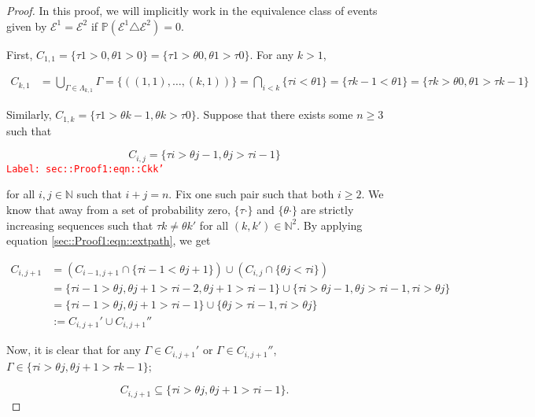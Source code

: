 \documentclass[12pt]{article}
\newcommand{\mb}{\mathbb}
\newcommand{\mc}{\mathcal}
\newcommand{\tr}{\textcolor{red}}
\newcommand{\labe}[1]{\tr{\texttt{Label: #1}}}
\newcommand{\ind}{\hspace{24pt}}
\newcommand{\pr}{\mb{P}}							%
\newcommand{\rt}{\tau}							%
\newcommand{\rtt}{\theta}						%
\renewcommand{\it}{k}							%
\newcommand{\apath}{\Gamma}						%
\newcommand{\pathset}[2]{\Lambda_{#1,#2}}		%
\newcommand{\pathsete}[2]{C_{#1,#2}}			%
\newcommand{\evnt}{\mc{E}}						%
\begin{document}
\begin{proof}
In this proof, we will implicitly work in the equivalence class of events given by \(\evnt^1 = \evnt^2\) if \(\pr(\evnt^1 \triangle \evnt^2) = 0\).  

\ind First, \(\pathsete{1}{1} = \{\rt{1} > 0,\rtt{1} > 0\} = \{\rt{1} > \rtt{0},\rtt{1}>\rt{0}\}\). For any \(\it > 1\),

\begin{align*}
\pathsete{\it}{1} &= \bigcup_{\apath \in \pathset{\it}{1}} \apath = \{((1,1),\dots,(\it,1))\} = \bigcap_{i < \it} \{\rt{i} < \rtt{1}\} = \{\rt{\it-1} < \rtt{1}\} = \{\rt{\it} > \rtt{0},\rtt{1} > \rt{\it-1}\}
\end{align*}

Similarly, \(\pathsete{1}{\it} = \{\rt{1} > \rtt{\it-1}, \rtt{\it} > \rt{0}\}\). Suppose that there exists some \(n\geq 3\) such that

\begin{equation}
\pathsete{i}{j} = \{\rt{i} > \rtt{j-1},\rtt{j} > \rt{i-1}\}
\label{sec::Proof1:eqn::Ckk'}
\end{equation}
\labe{sec::Proof1:eqn::Ckk'}

for all \(i, j\in \mb{N}\) such that \(i+j = n\). Fix one such pair such that both \(i \geq 2\). We know that away from a set of probability zero, \(\{\rt{\cdot}\}\) and \(\{\rtt{\cdot}\}\) are strictly increasing sequences such that \(\rt{\it} \neq \rtt{\it'}\) for all \((\it,\it')\in \mb{N}^2\). By applying equation \eqref{sec::Proof1:eqn::extpath}, we get

\begin{align*}
\pathsete{i}{j+1} &= \left(\pathsete{i-1}{j+1} \cap \{\rt{i - 1} < \rtt{j+1}\}\right) \cup \left(\pathsete{i}{j}\cap \{\rtt{j} < \rt{i}\}\right)\\
&= \{\rt{i - 1} > \rtt{j}, \rtt{j+1} > \rt{i - 2},  \rtt{j+1} > \rt{i -1}\}\cup\{\rt{i} > \rtt{j-1}, \rtt{j} > \rt{i - 1},\rt{i} > \rtt{j}\}\\
&= \{\rt{i - 1} > \rtt{j}, \rtt{j+1} > \rt{i - 1}\}\cup\{\rtt{j} > \rt{i - 1},\rt{i} > \rtt{j}\}\\
&:= \pathsete{i}{j+1}' \cup\pathsete{i}{j+1}''
\end{align*}

Now, it is clear that for any \(\apath \in \pathsete{i}{j+1}'\) or \(\apath \in \pathsete{i}{j+1}''\), \(\apath\in \{\rt{i} > \rtt{j},\rtt{j+1} > \rt{\it-1}\}\);

\[\pathsete{i}{j+1} \subseteq \{\rt{i} > \rtt{j},\rtt{j+1} > \rt{i-1}\}.\]


\end{proof}
\end{document}
